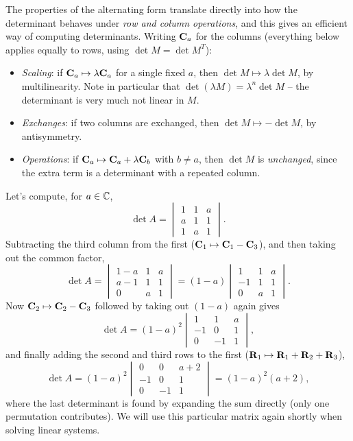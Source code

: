 \documentclass[a4paper]{scrartcl}
\begin{document}
The properties of the alternating form translate directly into how the determinant behaves under \emph{row and column operations}, and this gives an efficient way of computing determinants. Writing $\mathbf{C}_a$ for the columns (everything below applies equally to rows, using $\det M = \det M^T$):
\begin{itemize}
	\item \emph{Scaling}: if $\mathbf{C}_a \mapsto \lambda \mathbf{C}_a$ for a single fixed $a$, then $\det M \mapsto \lambda \det M$, by multilinearity. Note in particular that $\det (\lambda M) = \lambda^n \det M$ -- the determinant is very much not linear in $M$.
	\item \emph{Exchanges}: if two columns are exchanged, then $\det M \mapsto -\det M$, by antisymmetry.
	\item \emph{Operations}: if $\mathbf{C}_a \mapsto \mathbf{C}_a + \lambda \mathbf{C}_b$ with $b \neq a$, then $\det M$ is \emph{unchanged}, since the extra term is a determinant with a repeated column.
\end{itemize}

\begin{example}
	Let's compute, for $a \in \mathbb{C}$,
	$$
	\det A = \begin{vmatrix}
		1 & 1 & a \\ a & 1 & 1 \\ 1 & a & 1
	\end{vmatrix}.
	$$
	Subtracting the third column from the first ($\mathbf{C}_1 \mapsto \mathbf{C}_1 - \mathbf{C}_3$), and then taking out the common factor,
	$$
	\det A = \begin{vmatrix}
		1 - a & 1 & a \\ a - 1 & 1 & 1 \\ 0 & a & 1
	\end{vmatrix}
	= (1 - a)\begin{vmatrix}
		1 & 1 & a \\ -1 & 1 & 1 \\ 0 & a & 1
	\end{vmatrix}.
	$$
	Now $\mathbf{C}_2 \mapsto \mathbf{C}_2 - \mathbf{C}_3$ followed by taking out $(1 - a)$ again gives
	$$
	\det A = (1-a)^2\begin{vmatrix}
		1 & 1 & a \\ -1 & 0 & 1 \\ 0 & -1 & 1
	\end{vmatrix},
	$$
	and finally adding the second and third rows to the first ($\mathbf{R}_1 \mapsto \mathbf{R}_1 + \mathbf{R}_2 + \mathbf{R}_3$),
	$$
	\det A = (1 - a)^2 \begin{vmatrix}
		0 & 0 & a + 2 \\ -1 & 0 & 1 \\ 0 & -1 & 1
	\end{vmatrix} = (1-a)^2(a + 2),
	$$
	where the last determinant is found by expanding the sum directly (only one permutation contributes).
	We will use this particular matrix again shortly when solving linear systems.
\end{example}
\end{document}
